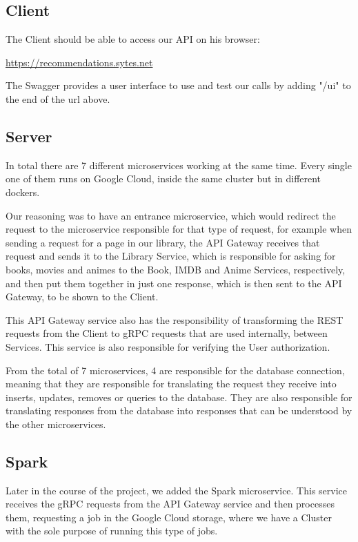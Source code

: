 \documentclass[oneside]{article}
\newcommand*\fpar{\hspace{1ex}}
\begin{document}
  \subsection{Client}
  \fpar The Client should be able to access our API on his browser:
  \begin{center}
    \url{https://recommendations.sytes.net}
  \end{center}
  \par The Swagger provides a user interface to use and test our calls by adding "/ui" to the end of the url above.

  \subsection{Server}
  \fpar In total there are 7 different microservices working at the same time. Every single one of them runs on Google Cloud, inside the same cluster but in different dockers.
  \par Our reasoning was to have an entrance microservice, which would redirect the request to the microservice responsible for that type of request, for example when sending a request for a page in our library, the API Gateway receives that request and sends it to the Library Service, which is responsible for asking for books, movies and animes to the Book, IMDB and Anime Services, respectively, and then put them together in just one response, which is then sent to the API Gateway, to be shown to the Client.
  \par This API Gateway service also has the responsibility of transforming the REST requests from the Client to gRPC requests that are used internally, between Services. This service is also responsible for verifying the User authorization.
  \par From the total of 7 microservices, 4 are responsible for the database connection, meaning that they are responsible for translating the request they receive into inserts, updates, removes or queries to the database. They are also responsible for translating responses from the database into responses that can be understood by the other microservices.

  \subsection{Spark}
  \fpar Later in the course of the project, we added the Spark microservice. This service receives the gRPC requests from the API Gateway service and then processes them, requesting a job in the Google Cloud storage, where we have a Cluster with the sole purpose of running this type of jobs.
\end{document}
